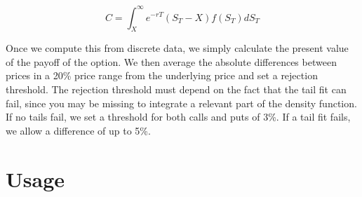 \documentclass[10pt,a4paper]{book}
\begin{document}
\begin{enumerate}
\begin{equation}
	C = \int_{X}^{\infty} e^{-rT} (S_T-X)f(S_T) dS_T
\end{equation}  
  
Once we compute this from discrete data, we simply calculate the present value of the payoff of the option. We then average the absolute differences between prices in a 20\% price range from the underlying price and set a rejection threshold. The rejection threshold must depend on the fact that the tail fit can fail, since you may be missing to integrate a relevant part of the density function. If no tails fail, we set a threshold for both calls and puts of 3\%. If a tail fit fails, we allow a difference of up to 5\%. 
\end{enumerate}

\raggedbottom
\pagebreak

\section{Usage}
\end{document}
